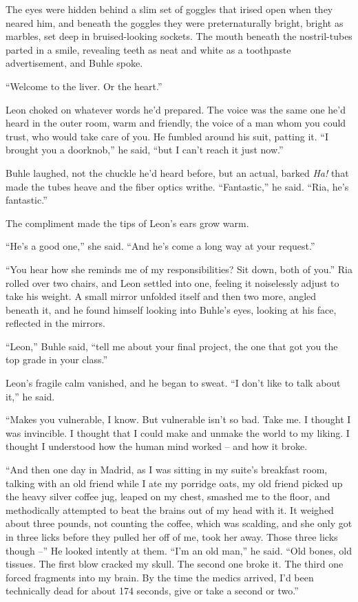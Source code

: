 The eyes were hidden behind a slim set of goggles that irised open when 
they neared him, and beneath the goggles they were preternaturally 
bright, bright as marbles, set deep in bruised-looking sockets. The 
mouth beneath the nostril-tubes parted in a smile, revealing teeth as 
neat and white as a toothpaste advertisement, and Buhle spoke.

“Welcome to the liver. Or the heart.”

Leon choked on whatever words he'd prepared. The voice was the same one 
he'd heard in the outer room, warm and friendly, the voice of a man 
whom you could trust, who would take care of you. He fumbled around his 
suit, patting it. “I brought you a doorknob,” he said, “but I 
can't reach it just now.”

Buhle laughed, not the chuckle he'd heard before, but an actual, barked 
\emph{Ha!} that made the tubes heave and the fiber optics writhe. 
“Fantastic,” he said. “Ria, he's fantastic.”

The compliment made the tips of Leon's ears grow warm.

“He's a good one,” she said. “And he's come a long way at your 
request.”

“You hear how she reminds me of my responsibilities? Sit down, both 
of you.” Ria rolled over two chairs, and Leon settled into one, 
feeling it noiselessly adjust to take his weight. A small mirror 
unfolded itself and then two more, angled beneath it, and he found 
himself looking into Buhle's eyes, looking at his face, reflected in 
the mirrors.

“Leon,” Buhle said, “tell me about your final project, the one 
that got you the top grade in your class.”

Leon's fragile calm vanished, and he began to sweat. “I don't like to 
talk about it,” he said.

“Makes you vulnerable, I know. But vulnerable isn't so bad. Take me. 
I thought I was invincible. I thought that I could make and unmake the 
world to my liking. I thought I understood how the human mind worked -- 
and how it broke.

“And then one day in Madrid, as I was sitting in my suite's breakfast 
room, talking with an old friend while I ate my porridge oats, my old 
friend picked up the heavy silver coffee jug, leaped on my chest, 
smashed me to the floor, and methodically attempted to beat the brains 
out of my head with it. It weighed about three pounds, not counting the 
coffee, which was scalding, and she only got in three licks before they 
pulled her off of me, took her away. Those three licks though --” He 
looked intently at them. “I'm an old man,” he said. “Old bones, 
old tissues. The first blow cracked my skull. The second one broke it. 
The third one forced fragments into my brain. By the time the medics 
arrived, I'd been technically dead for about 174 seconds, give or take 
a second or two.”

